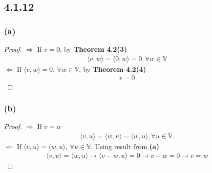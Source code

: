 \documentclass{article}
\newtheorem*{proof}{Proof}
\begin{document}
\subsection*{4.1.12}
\subsubsection*{(a)}
\begin{proof}
    \textbf{$\Rightarrow$} If $v = 0$, by \textbf{Theorem 4.2(3)}
        \begin{equation*}
            \begin{split}
                \langle v, w \rangle = \langle 0, w \rangle = 0, \forall w \in \mathbb{V}
            \end{split}
        \end{equation*}
    \textbf{$\Leftarrow$} If $\langle v, w \rangle = 0$, $\forall w \in \mathbb{V}$, by \textbf{Theorem 4.2(4)}
        \begin{equation*}
            \begin{split}
                v = 0
            \end{split}
        \end{equation*}
\end{proof}

\subsubsection*{(b)}
\begin{proof}
    \textbf{$\Rightarrow$} If $v = w$
        \begin{equation*}
            \begin{split}
                \langle v, u \rangle = \langle w, u \rangle = \langle w, u \rangle, \forall u \in \mathbb{V}.
            \end{split}
        \end{equation*}
    \textbf{$\Leftarrow$} If $\langle v, u \rangle = \langle w, u \rangle$, $\forall u \in \mathbb{V}$. Using result from \textbf{(a)}
        \begin{equation*}
            \begin{split}
                \langle v, u \rangle = \langle w, u \rangle \rightarrow \langle v-w, u \rangle = 0 \rightarrow v-w = 0 \rightarrow v = w
            \end{split}
        \end{equation*}
\end{proof}
\end{document}
